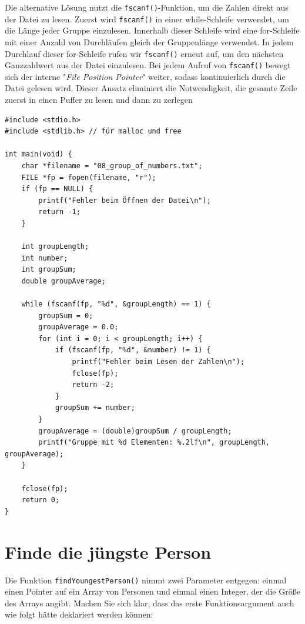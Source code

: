 Die alternative Lösung nutzt die \texttt{fscanf()}-Funktion, um die
Zahlen direkt aus der Datei zu lesen. Zuerst wird \texttt{fscanf()} in
einer while-Schleife verwendet, um die Länge jeder Gruppe einzulesen. Innerhalb
dieser Schleife wird eine for-Schleife mit einer Anzahl von Durchläufen gleich
der Gruppenlänge verwendet. In jedem Durchlauf dieser for-Schleife rufen wir
\texttt{fscanf()} erneut auf, um den nächsten Ganzzahlwert aus der Datei
einzulesen. Bei jedem Aufruf von \texttt{fscanf()} bewegt sich der
interne "\textit{File Position Pointer}" weiter, sodass kontinuierlich durch die
Datei gelesen wird. Dieser Ansatz eliminiert die Notwendigkeit, die gesamte
Zeile zuerst in einen Puffer zu lesen und dann zu zerlegen

\begin{verbatim}
#include <stdio.h>
#include <stdlib.h> // für malloc und free

int main(void) {
    char *filename = "08_group_of_numbers.txt";
    FILE *fp = fopen(filename, "r");
    if (fp == NULL) {
        printf("Fehler beim Öffnen der Datei\n");
        return -1;
    }

    int groupLength;
    int number;
    int groupSum;
    double groupAverage;

    while (fscanf(fp, "%d", &groupLength) == 1) {
        groupSum = 0;
        groupAverage = 0.0;
        for (int i = 0; i < groupLength; i++) {
            if (fscanf(fp, "%d", &number) != 1) {
                printf("Fehler beim Lesen der Zahlen\n");
                fclose(fp);
                return -2;
            }
            groupSum += number;
        }
        groupAverage = (double)groupSum / groupLength;
        printf("Gruppe mit %d Elementen: %.2lf\n", groupLength, groupAverage);
    }

    fclose(fp);
    return 0;
}
\end{verbatim}





\chapter{Finde die jüngste Person}

Die Funktion \texttt{findYoungestPerson()} nimmt zwei Parameter entgegen:
einmal einen Pointer auf ein Array von Personen und einmal einen Integer, der
die Größe des Arrays angibt. Machen Sie sich klar, dass das erste
Funktionsargument auch wie folgt hätte deklariert werden können:

